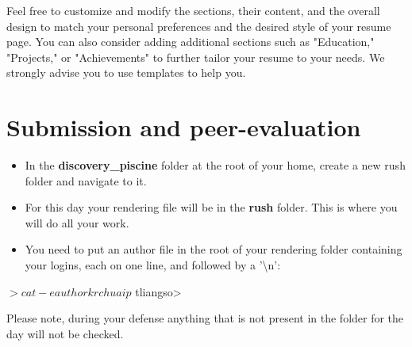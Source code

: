 \documentclass[12pt, a4paper]{report}
\begin{document}
	Feel free to customize and modify the sections, their content, and the overall design to match your personal preferences and the desired style of your resume page. You can also consider adding additional sections such as "Education," "Projects," or "Achievements" to further tailor your resume to your needs. We strongly advise you to use templates to help you.

	

\chapter{Submission and peer-evaluation}
	\begin{itemize}
		\item In the \textbf{discovery\_piscine} folder at the root of your home, create a new rush folder and navigate to it. 
		\item For this day your rendering file will be in the \textbf{rush} folder. This is where you will do all your work.
		\item You need to put an author file in the root of your rendering folder containing your
		logins, each on one line, and followed by a '\textbackslash n':
	\end{itemize}
	\begin{inverseverbatim}
		$> cat -e author
		krchuaip$
		tliangso$
		$>
	\end{inverseverbatim}

	\begin{caja}
		\vspace{.8cm}
		\footnotesize Please note, during your defense anything that is not present in the folder for the day will not be checked.
		\end{caja}
\end{document}

